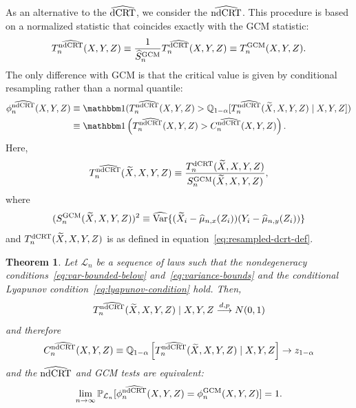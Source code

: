 \documentclass[aos]{imsart}
\newtheorem{theorem}{Theorem}
\theoremstyle{definition}
\theoremstyle{remark}
\newcommand{\V}{\mathrm{Var}}							%
\renewcommand{\P}{\mathbb{P}}							%
\newcommand{\Q}{\mathbb{Q}}								%
\newcommand{\indicator}{\mathbbm 1}						%
\newcommand{\srx}{X}									%
\newcommand{\srz}{Z}									%
\newcommand{\srxk}{\widetilde X}						%
\newcommand{\sry}{Y}									%
\newcommand{\law}{\mathcal L}							%
\newcommand{\dCRT}{\textnormal{dCRT}} 					%
\newcommand{\GCM}{\textnormal{GCM}}						%
\newcommand{\dCRThat}{\widehat{\textnormal{dCRT}}}		%
\newcommand{\ndCRThat}{\widehat{\textnormal{ndCRT}}}	%
\newcommand{\convdp}{\overset {d,p} \longrightarrow}    %
\begin{document}
As an alternative to the $\dCRThat$, we consider the $\ndCRThat$. This procedure is based on a normalized statistic that coincides exactly with the GCM statistic:
\begin{equation*}
T^{\ndCRThat}_n(\srx,\sry,\srz) \equiv \frac{1}{\widehat S_{n}^{\GCM}}T_n^{\dCRThat}(\srx, \sry, \srz) \equiv T^{\GCM}_n(\srx, \sry, \srz).
\end{equation*}
The only difference with GCM is that the critical value is given by conditional resampling rather than a normal quantile:
\begin{equation}
	\begin{split}
		\phi^{\ndCRThat}_n(\srx, \sry, \srz) &\equiv \indicator(T_n^{\ndCRThat}(\srx, \sry, \srz) > \Q_{1-\alpha}[T_n^{\ndCRThat}(\srxk, \srx, \sry, \srz) \mid \srx, \sry, \srz]) \\
		&\equiv \indicator\left(T_n^{\ndCRThat}(\srx, \sry, \srz) > C^{\ndCRThat}_n(\srx, \sry, \srz)\right).
	\end{split}
\end{equation}
Here, 
\begin{equation*}
T_n^{\ndCRThat}(\srxk, \srx, \sry, \srz) \equiv \frac{T_n^{\dCRT}(\srxk, \srx, \sry, \srz)}{S_n^{\GCM}(\srxk, \srx, \sry, \srz)},
\end{equation*}
where 
\begin{equation*}
(S_n^{\GCM}(\srxk, \srx, \sry, \srz))^2 \equiv \widehat{\V}\{(\srxk_i - \widehat \mu_{n,x}(\srz_i))(\sry_i - \widehat \mu_{n,y}(\srz_i))\}
\end{equation*}
and $T_n^{\dCRT}(\srxk, \srx, \sry, \srz)$ is as defined in equation~\eqref{eq:resampled-dcrt-def}.

\begin{theorem}\label{thm:normal-limit-ndcrt} 
	Let $\law_n$ be a sequence of laws such that the nondegeneracy conditions~\eqref{eq:var-bounded-below} and~\eqref{eq:variance-bounds} and the conditional Lyapunov condition~\eqref{eq:lyapunov-condition} hold. Then,
	\begin{equation}
		T^{\ndCRThat}_n(\srxk, \srx, \sry,\srz) \mid \srx, \sry, \srz \convdp N(0,1)
		\label{eq:conditional-convergence-ndcrt}
	\end{equation}
	and therefore
	\begin{equation}
		C^{\ndCRThat}_n(\srx, \sry, \srz) \equiv \Q_{1-\alpha}\left[T^{\ndCRThat}_n(\srxk, \srx, \sry,\srz) \mid \srx, \sry, \srz\right] \rightarrow z_{1-\alpha}
		\label{eq:critical-value-convergence-ndcrt}
	\end{equation}
	and the $\ndCRThat$ and GCM tests are equivalent:
	\begin{equation}
	\lim_{n \rightarrow \infty} \P_{\law_n}[\phi_n^{\ndCRThat}(\srx, \sry, \srz) = \phi_n^{\GCM}(\srx, \sry, \srz)] = 1.
	\label{eq:ndcrt-gcm-equivalence}
	\end{equation}
\end{theorem}
\end{document}
